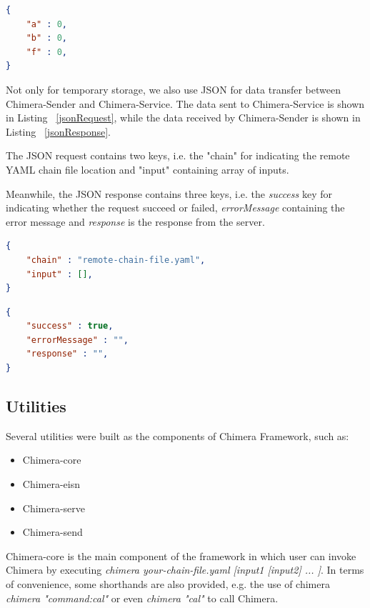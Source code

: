 \documentclass[conference]{IEEEtran}
\begin{document}
\begin{lstlisting}[caption=Initial content of JSON Storage, label=jsonStorageInitial, language=json, basicstyle=\small, breaklines=true]
{
    "a" : 0,
    "b" : 0,
    "f" : 0,
}
\end{lstlisting}

Not only for temporary storage, we also use JSON for data transfer between 
Chimera-Sender and Chimera-Service. The data sent to Chimera-Service is shown in Listing
~\ref{jsonRequest}, while the data received by Chimera-Sender is shown in Listing
~\ref{jsonResponse}.

The JSON request contains two keys, i.e. the "chain" for 
indicating the remote YAML chain file location and "input" containing array of inputs.

Meanwhile, the JSON response contains three keys, i.e. the {\it success} key for indicating
whether the request succeed or failed, {\it errorMessage} containing the error message and
{\it response} is the response from the server.

\begin{lstlisting}[caption=JSON Request, label=jsonRequest, language=json, basicstyle=\small, breaklines=true] 
{
    "chain" : "remote-chain-file.yaml",
    "input" : [],
}
\end{lstlisting}

\begin{lstlisting}[caption=JSON Response, label=jsonResponse, language=json, basicstyle=\small, breaklines=true]
{
    "success" : true,
    "errorMessage" : "",
    "response" : "",
}
\end{lstlisting}


\subsection{Utilities}

Several utilities were built as the components of Chimera Framework, such as:

\begin{itemize}
    \item Chimera-core
    \item Chimera-eisn
    \item Chimera-serve
    \item Chimera-send
\end{itemize}

Chimera-core is the main component of the framework in which user can invoke Chimera by
executing {\it chimera your-chain-file.yaml [input1 [input2] ... ]}. In terms of convenience,
some shorthands are also provided, e.g. the use of chimera 
{\it chimera "command:cal"} or even {\it chimera "cal"} to call Chimera.
\end{document}
